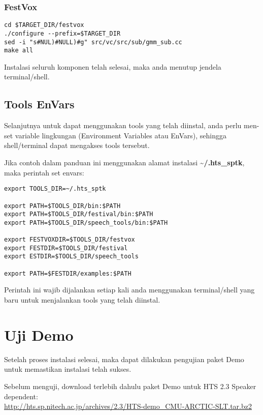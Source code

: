 \documentclass[12pt,]{article}
\begin{document}
	\subsubsection{FestVox}
	\begin{verbatim}
cd $TARGET_DIR/festvox
./configure --prefix=$TARGET_DIR
sed -i "s#NUL)#NULL)#g" src/vc/src/sub/gmm_sub.cc
make all
	\end{verbatim}
	
	Instalasi seluruh komponen telah selesai, maka anda menutup jendela terminal/shell.
	
	\subsection{Tools EnVars}
	
	Selanjutnya untuk dapat menggunakan tools yang telah diinstal,
	anda perlu men-set variable lingkungan (Environment Variables atau EnVars),
	sehingga shell/terminal dapat mengakses tools tersebut.
	
	Jika contoh dalam panduan ini menggunakan alamat instalasi \textbf{\textasciitilde/.hts\_sptk},
	maka perintah set envars:
	
	\begin{verbatim}
export TOOLS_DIR=~/.hts_sptk

export PATH=$TOOLS_DIR/bin:$PATH
export PATH=$TOOLS_DIR/festival/bin:$PATH
export PATH=$TOOLS_DIR/speech_tools/bin:$PATH

export FESTVOXDIR=$TOOLS_DIR/festvox
export FESTDIR=$TOOLS_DIR/festival
export ESTDIR=$TOOLS_DIR/speech_tools

export PATH=$FESTDIR/examples:$PATH
	\end{verbatim}
	
	Perintah ini wajib dijalankan setiap kali anda menggunakan terminal/shell yang baru untuk menjalankan tools yang telah diinstal.
	
	\newpage
	\section{Uji Demo}
	
	Setelah proses instalasi selesai, maka dapat dilakukan pengujian paket Demo untuk memastikan instalasi telah sukses.
	
	Sebelum menguji, download terlebih dahulu paket Demo untuk HTS 2.3 Speaker dependent:\\
	\url{http://hts.sp.nitech.ac.jp/archives/2.3/HTS-demo_CMU-ARCTIC-SLT.tar.bz2}
	
\end{document}
